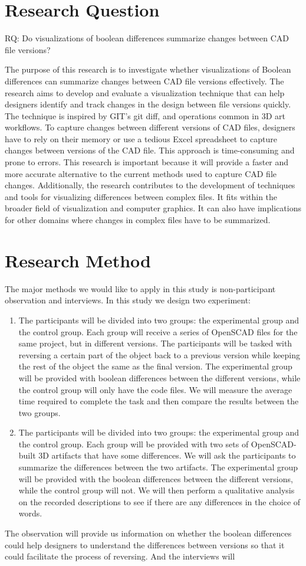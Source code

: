 \documentclass[sigconf,]{acmart}
\begin{document}
\section{Research Question}
RQ: Do visualizations of boolean differences summarize changes between CAD file versions?

The purpose of this research is to investigate whether visualizations of Boolean differences can summarize changes between CAD file versions effectively. The research aims to develop and evaluate a visualization technique that can help designers identify and track changes in the design between file versions quickly. The technique is inspired by GIT's git diff, and operations common in 3D art workflows. To capture changes between different versions of CAD files, designers have to rely on their memory or use a tedious Excel spreadsheet to capture changes between versions of the CAD file. This approach is time-consuming and prone to errors. This research is important because it will provide a faster and more accurate alternative to the current methods used to capture CAD file changes. Additionally, the research contributes to the development of techniques and tools for visualizing differences between complex files. It fits within the broader field of visualization and computer graphics. It can also have implications for other domains where changes in complex files have to be summarized.
\section{Research Method}
The major methods we would like to apply in this study is non-participant observation and interviews. In this study we design two experiment:
\begin{enumerate}
	\item The participants will be divided into two groups: the experimental group and the control group. Each group will receive a series of OpenSCAD files for the same project, but in different versions. The participants will be tasked with reversing a certain part of the object back to a previous version while keeping the rest of the object the same as the final version. The experimental group will be provided with boolean differences between the different versions, while the control group will only have the code files. We will measure the average time required to complete the task and then compare the results between the two groups.
	\item The participants will be divided into two groups: the experimental group and the control group. Each group will be provided with two sets of OpenSCAD-built 3D artifacts that have some differences. We will ask the participants to summarize the differences between the two artifacts. The experimental group will be provided with the boolean differences between the different versions, while the control group will not. We will then perform a qualitative analysis on the recorded descriptions to see if there are any differences in the choice of words.
\end{enumerate}
The observation will provide us information on whether the boolean differences could help designers to understand the differences between versions so that it could facilitate the process of reversing.
And the interviews will 
\end{document}

